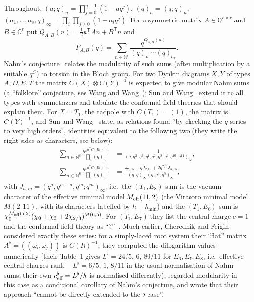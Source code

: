 \documentclass[11pt]{amsart}
\theoremstyle{definition}
\numberwithin{equation}{section}
\newcommand{\Q}{\mathbb{Q}}
\newcommand{\N}{\mathbb{N}}
\newcommand{\T}{\mathsf T}
\begin{document}
Throughout, $(a;q)_n=\prod_{j=0}^{n-1}(1-aq^j)$, $(q)_n=(q;q)_n$,
$(a_1,\dots,a_s;q)_\infty=\prod_i\prod_{j\ge0}(1-a_iq^j)$. For a symmetric matrix $A\in\Q^{r\times r}$ and
$B\in\Q^r$ put $Q_{A,B}(n)=\frac12n^{\T}An+B^{\T}n$ and
\begin{equation}\label{eq:F}
F_{A,B}(q)=\sum_{n\in\N^r}\frac{q^{Q_{A,B}(n)}}{(q)_{n_1}\cdots(q)_{n_r}} .
\end{equation}
Nahm's conjecture~\cite{Nahm,Zagier} relates the modularity of such sums (after multiplication by a
suitable $q^C$) to torsion in the Bloch group. For two Dynkin diagrams $X,Y$ of types $A,D,E,T$ the matrix
$C(X)\otimes C(Y)^{-1}$ is expected to give modular Nahm sums (a ``folklore'' conjecture, see Wang and
Wang~\cite[Conjecture~1.1]{WW-Dr}); Sun and Wang~\cite[Conjecture~1.1]{SW} extend it to all types with
symmetrizers and tabulate the conformal field theories that should explain them. For $X=T_1$, the tadpole
with $C(T_1)=(1)$, the matrix is $C(Y)^{-1}$, and Sun and Wang~\cite[§3]{SW} state, as relations found ``by
checking the $q$-series to very high orders'', identities equivalent to the following two (they write
the right sides as characters, see below):
\begin{align}
\sum_{n\in\N^8}\frac{q^{\frac12n^{\T}C(E_8)^{-1}n}}{\prod_i(q)_{n_i}}&=\frac1{(q,q^2,q^3,q^4,q^7,q^8,q^9,q^{10};q^{11})_\infty},
\tag{$\sim$SW 3.20}\label{eq:SW320}\\
\sum_{n\in\N^6}\frac{q^{\frac12n^{\T}C(E_6)^{-1}n}}{\prod_i(q)_{n_i}}&=\frac{J_{7,15}-qJ_{2,15}+2q^{2/3}J_{3,15}}{(q;q)_\infty\,(q,q^4;q^5)_\infty},
\tag{$\sim$SW 3.19}\label{eq:SW319}
\end{align}
with $J_{a,m}=(q^a,q^{m-a},q^m;q^m)_\infty$; i.e.\ the $(T_1,E_8)$ sum is the vacuum character of the
effective minimal model $M_{\rm eff}(11,2)$ (the Virasoro minimal model $M(2,11)$, with its characters
labelled by $h-h_{\min}$) and the $(T_1,E_6)$ sum is
$\chi_0^{M_{\rm eff}(5,2)}(\chi_0+\chi_3+2\chi_{2/3})^{M(6,5)}$. For $(T_1,E_7)$ they list the central charge
$c=1$ and the conformal field theory as ``?''~\cite[Table~1]{SW}. Much earlier, Cherednik and
Feigin~\cite[§3.6, ``Theta of level 1/2'']{CF} considered exactly these series: for a simply-laced root
system their ``flat'' matrix $A^\flat=((\omega_i,\omega_j))$ is $C(R)^{-1}$; they computed the
dilogarithm values numerically (their Table~1 gives $L^\flat=24/5,\,6,\,80/11$ for $E_6,E_7,E_8$, i.e.\
effective central charges $\mathrm{rank}-L^\flat=6/5,\,1,\,8/11$ in the usual normalisation of Nahm
sums; their own $c^\flat_{\rm eff}=L^\flat/h$ is normalised differently), regarded modularity in this case
as a conditional corollary of Nahm's conjecture, and wrote that their approach ``cannot
be directly extended to the $\flat$-case''.
\end{document}
